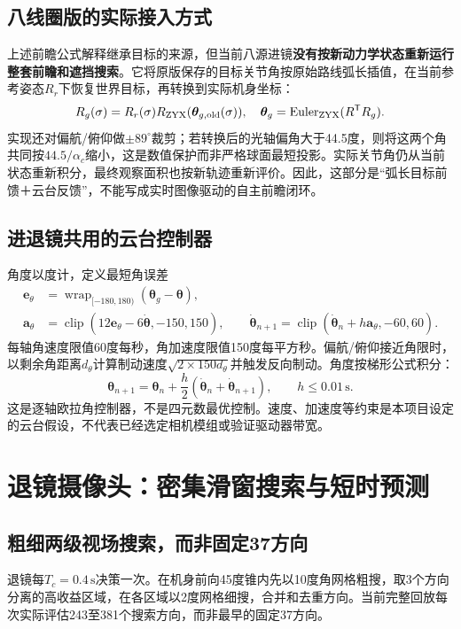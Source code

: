 \documentclass[UTF8,a4paper,zihao=5,fontset=windows]{ctexart}
\newcommand{\vect}[1]{\bm{#1}}
\newcommand{\clip}{\operatorname{clip}}
\newcommand{\wrap}{\operatorname{wrap}}
\newcommand{\unit}[1]{\,\mathrm{#1}}
\begin{document}
\subsection{八线圈版的实际接入方式}
上述前瞻公式解释继承目标的来源，但当前八源进镜\textbf{没有按新动力学状态重新运行整套前瞻和遮挡搜索}。它将原版保存的目标关节角按原始路线弧长插值，在当前参考姿态$R_r$下恢复世界目标，再转换到实际机身坐标：
\begin{equation}
R_g(\sigma)=R_r(\sigma)R_{\rm ZYX}(\vect\theta_{g,\rm old}(\sigma)),\quad
\vect\theta_g=\operatorname{Euler}_{\rm ZYX}(R^{\mathsf T}R_g).
\label{eq:insertion_reuse}
\end{equation}
实现还对偏航/俯仰做$\pm89^\circ$裁剪；若转换后的光轴偏角大于44.5度，则将这两个角共同按$44.5/\alpha_c$缩小，这是数值保护而非严格球面最短投影。实际关节角仍从当前状态重新积分，最终观察面积也按新轨迹重新评价。因此，这部分是“弧长目标前馈＋云台反馈”，不能写成实时图像驱动的自主前瞻闭环。

\subsection{进退镜共用的云台控制器}
角度以度计，定义最短角误差
\begin{align}
\vect e_\theta&=\wrap_{[-180,180)}(\vect\theta_g-\vect\theta),\\
\vect a_\theta&=\clip(12\vect e_\theta-6\dot{\vect\theta},-150,150),\qquad
\dot{\vect\theta}_{n+1}=\clip(\dot{\vect\theta}_n+h\vect a_\theta,-60,60).
\label{eq:gimbal_pd}
\end{align}
每轴角速度限值60度每秒，角加速度限值150度每平方秒。偏航/俯仰接近角限时，以剩余角距离$d_\theta$计算制动速度$\sqrt{2\times150d_\theta}$并触发反向制动。角度按梯形公式积分：
\begin{equation}
\vect\theta_{n+1}=\vect\theta_n+\frac h2(\dot{\vect\theta}_n+\dot{\vect\theta}_{n+1}),\qquad h\le0.01\unit s.
\label{eq:gimbal_integration}
\end{equation}
这是逐轴欧拉角控制器，不是四元数最优控制。速度、加速度等约束是本项目设定的云台假设，不代表已经选定相机模组或验证驱动器带宽。

\section{退镜摄像头：密集滑窗搜索与短时预测}
\subsection{粗细两级视场搜索，而非固定37方向}
退镜每$T_c=0.4\unit s$决策一次。在机身前向45度锥内先以10度角网格粗搜，取3个方向分离的高收益区域，在各区域以2度网格细搜，合并和去重方向。当前完整回放每次实际评估243至381个搜索方向，而非最早的固定37方向。
\end{document}

